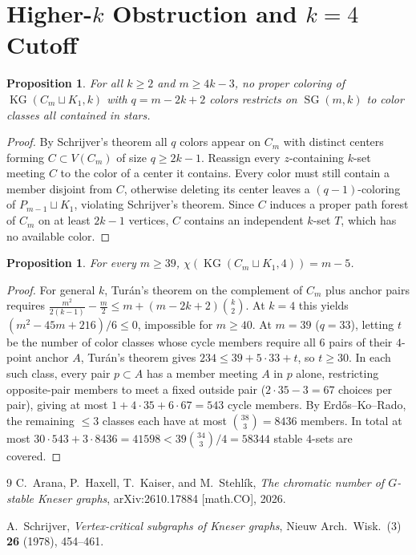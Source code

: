 \documentclass[11pt]{article}
\newtheorem{proposition}[theorem]{Proposition}
\DeclareMathOperator{\KG}{KG}
\DeclareMathOperator{\SG}{SG}
\begin{document}
\section{Higher-$k$ Obstruction and $k = 4$ Cutoff}

\begin{proposition}
For all $k \ge 2$ and $m \ge 4k - 3$, no proper coloring of $\KG(C_m \sqcup K_1, k)$ with $q = m - 2k + 2$ colors restricts on $\SG(m, k)$ to color classes all contained in stars.
\end{proposition}

\begin{proof}
By Schrijver's theorem all $q$ colors appear on $C_m$ with distinct centers forming $C \subset V(C_m)$ of size $q \ge 2k - 1$. Reassign every $z$-containing $k$-set meeting $C$ to the color of a center it contains. Every color must still contain a member disjoint from $C$, otherwise deleting its center leaves a $(q - 1)$-coloring of $P_{m-1} \sqcup K_1$, violating Schrijver's theorem. Since $C$ induces a proper path forest of $C_m$ on at least $2k - 1$ vertices, $C$ contains an independent $k$-set $T$, which has no available color.
\end{proof}

\begin{proposition}
For every $m \ge 39$, $\chi(\KG(C_m \sqcup K_1, 4)) = m - 5$.
\end{proposition}

\begin{proof}
For general $k$, Tur\'an's theorem on the complement of $C_m$ plus anchor pairs requires $\frac{m^2}{2(k-1)} - \frac{m}{2} \le m + (m - 2k + 2)\binom{k}{2}$. At $k = 4$ this yields $(m^2 - 45m + 216)/6 \le 0$, impossible for $m \ge 40$. At $m = 39$ ($q = 33$), letting $t$ be the number of color classes whose cycle members require all $6$ pairs of their $4$-point anchor $A$, Tur\'an's theorem gives $234 \le 39 + 5 \cdot 33 + t$, so $t \ge 30$. In each such class, every pair $p \subset A$ has a member meeting $A$ in $p$ alone, restricting opposite-pair members to meet a fixed outside pair ($2 \cdot 35 - 3 = 67$ choices per pair), giving at most $1 + 4 \cdot 35 + 6 \cdot 67 = 543$ cycle members. By Erd\H{o}s--Ko--Rado, the remaining $\le 3$ classes each have at most $\binom{38}{3} = 8436$ members. In total at most $30 \cdot 543 + 3 \cdot 8436 = 41598 < 39\binom{34}{3}/4 = 58344$ stable $4$-sets are covered.
\end{proof}

\begin{thebibliography}{9}
C.~Arana, P.~Haxell, T.~Kaiser, and M.~Stehl\'ik, \emph{The chromatic number of $G$-stable Kneser graphs}, arXiv:2610.17884 [math.CO], 2026.

A.~Schrijver, \emph{Vertex-critical subgraphs of Kneser graphs}, Nieuw Arch.\ Wisk.\ (3) \textbf{26} (1978), 454--461.
\end{thebibliography}
\end{document}

